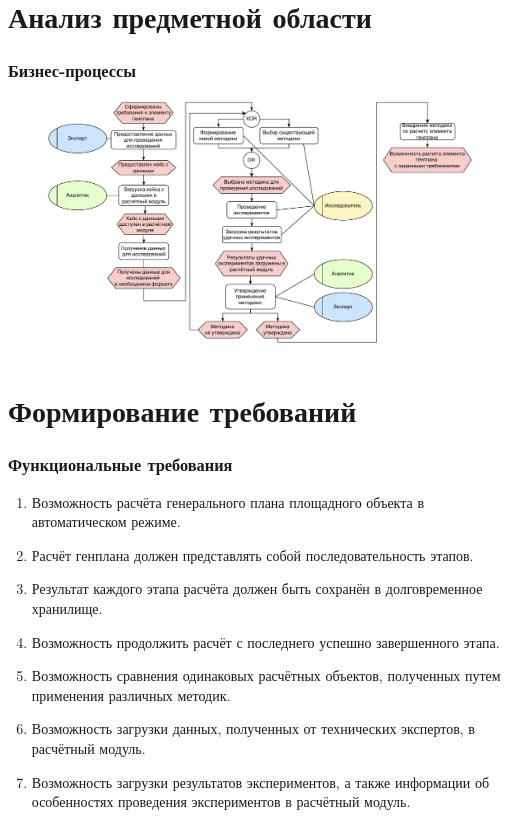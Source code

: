 \section{Анализ предметной области}

\begin{frame}
\frametitle{Бизнес-процессы}
\begin{figure}
    \includegraphics[scale=.48]{pictures/analysis/common_epc}
\end{figure}
\end{frame}



\section{Формирование требований}

\begin{frame}
\frametitle{Функциональные требования}
\begin{enumerate}
    \item {
        Возможность расчёта генерального плана площадного объекта в автоматическом режиме.
    }
    \item {
        Расчёт генплана должен представлять собой последовательность этапов.
    }
    \item {
        Результат каждого этапа расчёта должен быть сохранён в долговременное хранилище.
    }
    \item {
        Возможность продолжить расчёт с последнего успешно завершенного этапа.
    }
    \item {
        Возможность сравнения одинаковых расчётных объектов, полученных путем применения различных методик.
    }
    \item {
        Возможность загрузки данных, полученных от технических экспертов, в расчётный модуль.
    }
    \item {
        Возможность загрузки результатов экспериментов, а также информации об особенностях
        проведения экспериментов в расчётный модуль.
    }
\end{enumerate}
\end{frame}


